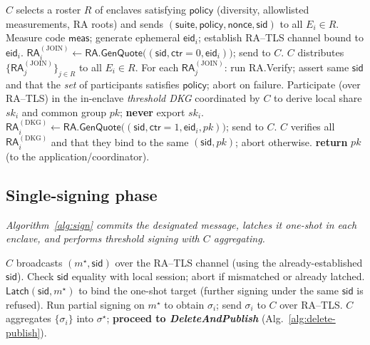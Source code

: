 \documentclass[runningheads,orivec]{llncs}
\newcommand{\prot}{\textsf{QuanTEEum}}
\begin{document}
\begin{algorithm}[!htbp]
\caption{\prot{}: \emph{SetupAndDKG}}
\label{alg:setup}
\begin{small}
\begin{algorithmic}[1]
\State $C$ selects a roster $R$ of enclaves satisfying $\mathsf{policy}$ (diversity, allowlisted measurements, RA roots) and sends $(\mathsf{suite},\mathsf{policy},\mathsf{nonce},\mathsf{sid})$ to all $E_i\in R$.
  \State Measure code $\mathsf{meas}$; generate ephemeral $\mathsf{eid}_i$; establish RA--TLS channel bound to $\mathsf{eid}_i$.
  \State $\mathsf{RA}^{(\mathrm{JOIN})}_i \gets \textsf{RA.GenQuote}\big((\mathsf{sid},\mathsf{ctr}{=}0,\mathsf{eid}_i)\big)$; send to $C$.
\EndFor
\State $C$ distributes $\{\mathsf{RA}^{(\mathrm{JOIN})}_j\}_{j\in R}$ to all $E_i\in R$.
  \State For each $\mathsf{RA}^{(\mathrm{JOIN})}_j$: run \textsf{RA.Verify}; assert same $\mathsf{sid}$ and that the \emph{set} of participants satisfies $\mathsf{policy}$; abort on failure.
  \State Participate (over RA--TLS) in the in\mbox{-}enclave \emph{threshold DKG} coordinated by $C$ to derive local share $sk_i$ and common group $pk$; \textbf{never} export $sk_i$.
  \State $\mathsf{RA}^{(\mathrm{DKG})}_i \gets \textsf{RA.GenQuote}\big((\mathsf{sid},\mathsf{ctr}{=}1,\mathsf{eid}_i,pk)\big)$; send to $C$.
\EndFor
\State $C$ verifies all $\mathsf{RA}^{(\mathrm{DKG})}_i$ and that they bind to the same $(\mathsf{sid},pk)$; abort otherwise.
\State \textbf{return} $pk$ (to the application/coordinator).
\end{algorithmic}
\end{small}
\end{algorithm}

\subsection{Single-signing phase}
\emph{Algorithm~\ref{alg:sign} commits the designated message, latches it one-shot in each enclave, and performs threshold signing with $C$ aggregating.}

\begin{algorithm}[!htbp]
\caption{\prot{}: \emph{SingleSign} on designated message $m^{\star}$}
\label{alg:sign}
\begin{small}
\begin{algorithmic}[1]
\State $C$ broadcasts $(m^{\star},\mathsf{sid})$ over the RA--TLS channel (using the already-established $\mathsf{sid}$).
  \State Check $\mathsf{sid}$ equality with local session; abort if mismatched or already latched.
  \State $\textsf{Latch}(\mathsf{sid},m^{\star})$ to bind the one-shot target (further signing under the same $\mathsf{sid}$ is refused).
  \State Run partial signing on $m^{\star}$ to obtain $\sigma_i$; send $\sigma_i$ to $C$ over RA--TLS.
\EndFor
\State $C$ aggregates $\{\sigma_i\}$ into $\sigma^{\star}$; \textbf{proceed to \emph{DeleteAndPublish}} (Alg.~\ref{alg:delete-publish}).
\end{algorithmic}
\end{small}
\end{algorithm}
\end{document}
